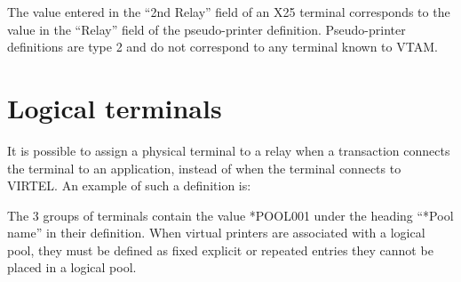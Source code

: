 \documentclass[letterpaper,10pt,english]{sphinxmanual}
\begin{document}
The value entered in the “2nd Relay” field of an X25 terminal corresponds to the value in the “Relay” field of the pseudo-printer definition. Pseudo-printer definitions are type 2 and do not correspond to any terminal known to VTAM.


\section{Logical terminals}
\label{\detokenize{connectivity_guide:logical-terminals}}
It is possible to assign a physical terminal to a relay when a transaction connects the terminal to an application, instead of when the terminal connects to VIRTEL. An example of such a definition is:

\begin{sphinxVerbatim}[commandchars=\\\{\}]
  

                 

                          
\end{sphinxVerbatim}

\begin{sphinxVerbatim}[commandchars=\\\{\}]
      

                 

                          
                          
                          
\end{sphinxVerbatim}

The 3 groups of terminals contain the value *POOL001 under the heading “*Pool name” in their definition. When virtual printers are associated with a logical pool, they must be defined as fixed explicit or repeated entries \textendash{} they cannot be placed in a logical pool.
\end{document}
